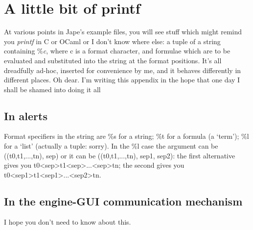 \chapter{A little bit of printf}
\label{appx:sortofprintf}

At various points in Jape's example files, you will see stuff which might remind you \textit{printf} in C or OCaml or I don't know where else: a tuple of a string containing \%\textit{c}, where c is a format character, and formulae which are to be evaluated and substituted into the string at the format positions. It's all dreadfully ad-hoc, inserted for convenience by me, and it behaves differently in different places. Oh dear. I'm writing this appendix in the hope that one day I shall be shamed into doing it all 

\section{In alerts}
\label{sec:printfalerts}

Format specifiers in the string are  \%s for a string; \%t for a formula (a `term'); \%l for a `list' (actually a tuple: sorry). In the \%l case the argument can be ((t0,t1,...,tn), sep) or it can be ((t0,t1,...,tn), sep1, sep2): the first alternative gives you t0<sep>t1<sep>...<sep>tn; the second gives you t0<sep1>t1<sep1>...<sep2>tn.

\section{In the engine-GUI communication mechanism}

I hope you don't need to know about this.